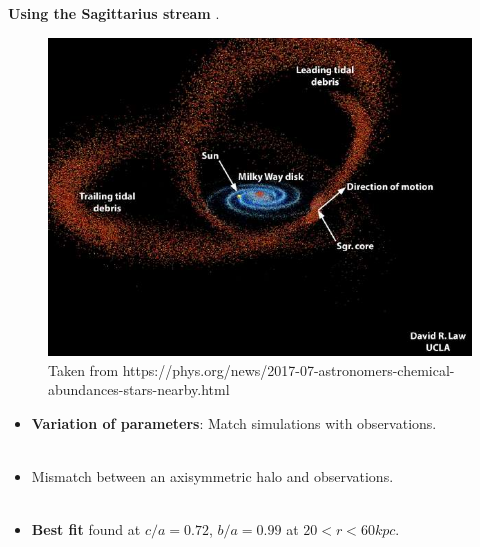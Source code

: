 \documentclass[xcolor=dvipsnames]{beamer}
\begin{document}
\begin{frame}

\textbf{Using the Sagittarius stream} \cite[Law \& Majewski 2010]{LawMajewski2010}.

\begin{figure}[c]
\includegraphics[width=0.6\linewidth]{./pics/Sagitarius.jpg}
\caption{\tiny Taken from https://phys.org/news/2017-07-astronomers-chemical-abundances-stars-nearby.html}
\end{figure}

\end{frame}


\begin{frame}

\centering
\small
\begin{itemize}

\item \textbf{Variation of parameters}: Match simulations with observations.\\~\\

\item Mismatch between an axisymmetric halo and observations.\\~\\

\item \textbf{Best fit} found at $c/a = 0.72$, $b/a = 0.99$ at $20<r<60 kpc$. 

\end{itemize}

\end{frame}
\end{document}
